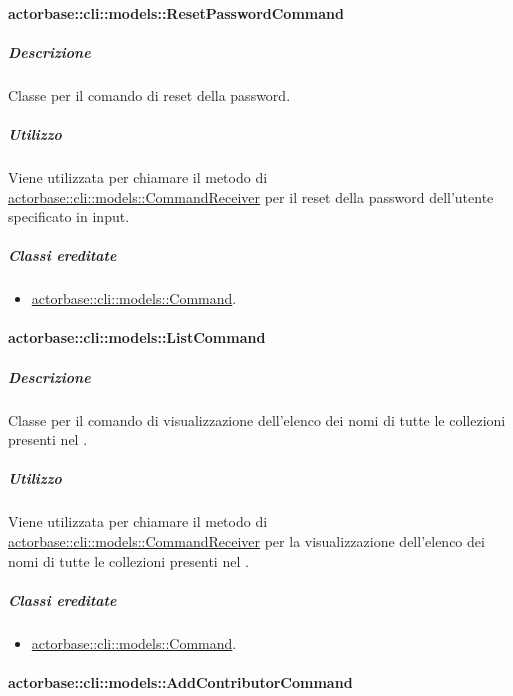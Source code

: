 \documentclass{scalatekids-article}
\begin{document}
\paragraph{actorbase::cli::models::ResetPasswordCommand}
\label{sec:actorbase::cli::models::ResetPasswordCommand}

\subparagraph{Descrizione}

Classe per il comando di reset della password.

\subparagraph{Utilizzo}

Viene utilizzata per chiamare il metodo di
\hyperref[sec:actorbase::cli::models::CommandReceiver]{actorbase::cli::models::CommandReceiver} per il reset della password
dell'utente specificato in input.

\subparagraph{Classi ereditate}

\begin{itemize}
\item \hyperref[sec:actorbase::cli::models::Command]{actorbase::cli::models::Command}.
\end{itemize}

\paragraph{actorbase::cli::models::ListCommand}
\label{sec:actorbase::cli::models::ListCommand}

\subparagraph{Descrizione}

Classe per il comando di visualizzazione dell'elenco dei nomi di tutte le
collezioni presenti nel .

\subparagraph{Utilizzo}

Viene utilizzata per chiamare il metodo di
\hyperref[sec:actorbase::cli::models::CommandReceiver]{actorbase::cli::models::CommandReceiver} per la visualizzazione dell'elenco dei
nomi di tutte le collezioni presenti nel .

\subparagraph{Classi ereditate}

\begin{itemize}
\item \hyperref[sec:actorbase::cli::models::Command]{actorbase::cli::models::Command}.
\end{itemize}

\paragraph{actorbase::cli::models::AddContributorCommand}
\label{sec:actorbase::cli::models::AddContributorCommand}
\end{document}
